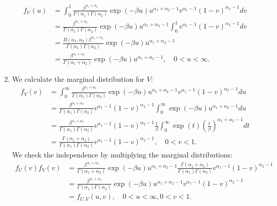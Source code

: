 \begin{solution}
\begin{enumerate}[label = (\alph*)]
\begin{align*}
      f_U(u) &= \int_0^1 \frac{\beta^{\alpha_1 + \alpha_2}}{\Gamma(\alpha_1)\Gamma(\alpha_2)}
      \exp(-\beta u)u^{\alpha_1 + \alpha_2 - 1}v^{\alpha_1 - 1}(1-v)^{\alpha_2 - 1} dv \\
      &= \frac{\beta^{\alpha_1 + \alpha_2}}{\Gamma(\alpha_1)\Gamma(\alpha_2)}
      \exp(-\beta u)u^{\alpha_1 + \alpha_2 - 1}\int_0^1 v^{\alpha_1 - 1}(1-v)^{\alpha_2 - 1} dv \\
      &= \frac{B(\alpha_1, \alpha_2)\beta^{\alpha_1 + \alpha_2}}{\Gamma(\alpha_1)\Gamma(\alpha_2)}
      \exp(-\beta u)u^{\alpha_1 + \alpha_2 - 1} \\
      &= \frac{\beta^{\alpha_1 + \alpha_2}}{\Gamma(\alpha_1 + \alpha_2)}
      \exp(-\beta u)u^{\alpha_1 + \alpha_2 - 1}, \quad 0 < u < \infty.
    \end{align*}
    \item We calculate the marginal distribution for $V$:
    \begin{align*}
      f_V(v) &= \int_0^{\infty}\frac{\beta^{\alpha_1 + \alpha_2}}{\Gamma(\alpha_1)\Gamma(\alpha_2)}
      \exp(-\beta u)u^{\alpha_1 + \alpha_2 - 1}v^{\alpha_1 - 1}(1-v)^{\alpha_2 - 1} du \\
      &= \frac{\beta^{\alpha_1 + \alpha_2}}{\Gamma(\alpha_1)\Gamma(\alpha_2)}v^{\alpha_1 - 1}(1-v)^{\alpha_2 - 1}
      \int_0^{\infty}\exp(-\beta u)u^{\alpha_1 + \alpha_2 - 1} du \\
      &= \frac{\beta^{\alpha_1 + \alpha_2}}{\Gamma(\alpha_1)\Gamma(\alpha_2)}v^{\alpha_1 - 1}(1-v)^{\alpha_2 - 1}
      \frac{1}{\beta}\int_0^{\infty}\exp(t)\left(\frac{t}{\beta}\right)^{\alpha_1 + \alpha_2 - 1} dt \\
      &= \frac{\Gamma(\alpha_1+\alpha_2)}{\Gamma(\alpha_1)\Gamma(\alpha_2)}v^{\alpha_1 - 1}(1-v)^{\alpha_2 - 1}, \quad 0 < v < 1.
    \end{align*}
    We check the independence by multiplying the marginal distributions:
    \begin{align*}
      f_U(v)f_V(v) &= \frac{\beta^{\alpha_1 + \alpha_2}}{\Gamma(\alpha_1 + \alpha_2)}
      \exp(-\beta u)u^{\alpha_1 + \alpha_2 - 1}\frac{\Gamma(\alpha_1+\alpha_2)}{\Gamma(\alpha_1)\Gamma(\alpha_2)}
      v^{\alpha_1 - 1}(1-v)^{\alpha_2 - 1} \\
      &= \frac{\beta^{\alpha_1 + \alpha_2}}{\Gamma(\alpha_1)\Gamma(\alpha_2)}
      \exp(-\beta u)u^{\alpha_1 + \alpha_2 - 1}v^{\alpha_1 - 1}(1-v)^{\alpha_2 - 1} \\
      &= f_{U,V}(u,v), \quad 0 < u < \infty, 0 < v < 1.
    \end{align*}
\end{enumerate}

\end{solution}

